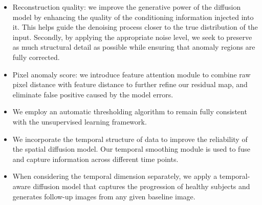 \begin{itemize}
    \item Reconstruction quality: we improve the generative power of the diffusion model by enhancing the quality of the conditioning information injected into it. This helps guide the denoising process closer to the true distribution of the input. Secondly, by applying the appropriate noise level, we seek to preserve as much structural detail as possible while ensuring that anomaly regions are fully corrected.
    \item Pixel anomaly score: we introduce feature attention module to combine raw pixel distance with feature distance to further refine our residual map, and eliminate false positive caused by the model errors.
    \item We employ an automatic thresholding algorithm to remain fully consistent with the unsupervised learning framework.
    \item We incorporate the temporal structure of data to improve the reliability of the spatial diffusion model. Our temporal smoothing module is used to fuse and capture information across different time points. 
    \item When considering the temporal dimension separately, we apply a temporal-aware diffusion model that captures the progression of healthy subjects and generates follow-up images from any given baseline image.
\end{itemize}



